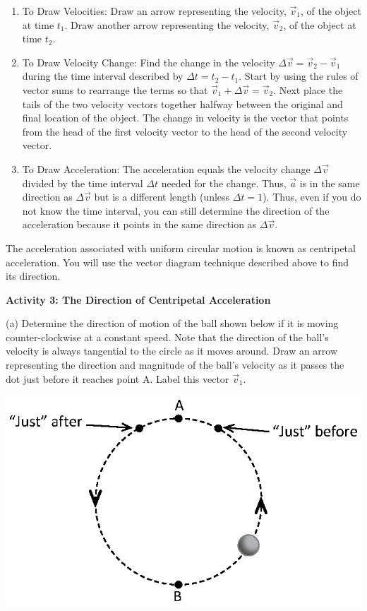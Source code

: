 \begin{enumerate}
\item To Draw Velocities: Draw an arrow representing the velocity, \( {\vec v}_{1} \), of
the object at time \( t_{1} \). Draw another arrow representing the velocity,
\( {\vec v}_{2} \), of the object at time \( t_{2} \). 
\item To Draw Velocity Change: Find the change in the velocity \( \Delta 
{\vec v}
= {\vec v}_{2}  - {\vec v}_{1} \) during the time interval described
by \( \Delta  t = t_{2} - t_{1} \). Start by using the rules of
vector sums to rearrange the terms so that $\vec{ v}_{1} + \Delta {\vec v}
= {\vec v}_{2}$. Next place the tails of the two velocity vectors together
halfway between the original and final location of the object. The change in
velocity is the vector that points from the head of the first velocity vector
to the head of the second velocity vector. 
\item To Draw Acceleration: The acceleration equals the velocity change 
\( \Delta  \vec{v}\)
divided by the time interval $\Delta t$ needed for the change. Thus, $\vec{a}$ is in
the same direction as \( \Delta  \vec{v}\) but is a different length (unless
 \( \Delta  t = 1\)). Thus, even if you do not know the time interval, you
can still determine the direction of the acceleration because it points in the
same direction as \( \Delta  \)$\vec{v}$. 
\end{enumerate}
The acceleration associated with uniform circular motion is known as centripetal
acceleration. You will use the vector diagram technique described above to find
its direction. 

\pagebreak[2]
\textbf{Activity 3: The Direction of Centripetal Acceleration }

(a) Determine the direction of motion of the ball shown below if it is moving
counter-clockwise at a constant speed. Note that the direction of the ball's
velocity is always tangential to the circle as it moves around. Draw an arrow
representing the direction and magnitude of the ball's velocity as it passes
the dot just before it reaches point A. Label this vector $\vec{v}_{1}$. 

{\par\centering \includegraphics{circ_motion/circ_motion_fig2_new.eps} \par}

